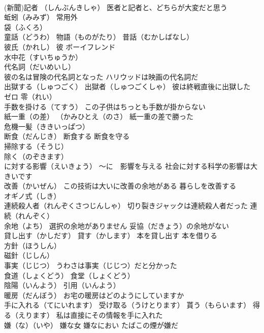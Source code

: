 \documentclass[8pt]{extreport}
\begin{document}
\begin{CJK}{UTF8}{min}
\\	(新聞)記者 （しんぶんきしゃ） 医者と記者と、どちらが大変だと思う
\\	蚯蚓（みみず） 常用外
\\	袋（ふくろ）
\\	童話（どうわ） 物語（ものがたり） 昔話（むかしばなし）
\\	彼氏（かれし） 彼 ボーイフレンド
\\	水中花（すいちゅうか）
\\	代名詞（だいめいし） 
\\	彼の名は冒険の代名詞となった ハリウッドは映画の代名詞だ
\\	出獄する（しゅつごく） 出獄者（しゅつごくしゃ） 彼は終戦直後に出獄した
\\	ゼロ 零（れい）
\\	手数を掛ける（てすう） この子供はちっとも手数が掛からない
\\	紙一重（の差） （かみひとえ（のさ） 紙一重の差で勝った
\\	危機一髪（ききいっぱつ）
\\	断食（だんじき） 断食する 断食を守る
\\	掃除する（そうじ） 
\\	除く（のぞきます）
\\	に対する影響（えいきょう） ～に　影響を与える 社会に対する科学の影響は大きいです
\\	改善（かいぜん） この技術は大いに改善の余地がある 暮らしを改善する
\\	オギノ式（しき）
\\	連続殺人者（れんぞくさつじんしゃ） 切り裂きジャックは連続殺人者だった 連続（れんぞく）
\\	余地（よち） 選択の余地がありません 妥協（だきょう）の余地がない
\\	貸し出す（かしだす） 貸す（かします） 本を貸し出す 本を借りる
\\	方針（ほうしん） 
\\	磁針（じしん）
\\	事実（じじつ） うわさは事実（じじつ）だと分かった
\\	食道（しょくどう） 食堂（しょくどう）
\\	陰陽（いんよう） 引用（いんよう） 
\\	暖房（だんぼう） お宅の暖房はどのようにしていますか
\\	手に入れる（てにいれます） 受け取る（うけとります） 貰う（もらいます） 得る（えります） 私は直接にその情報を手に入れた
\\	嫌（な）（いや） 嫌な女 嫌なにおい たばこの煙が嫌だ

\end{CJK}
\end{document}
